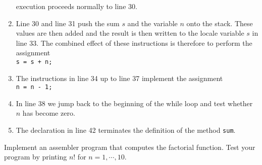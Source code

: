 \begin{enumerate}
      execution proceeds normally to line 30.
\item Line 30 and line 31 push the sum $s$ and the variable $n$ onto the stack.  These
      values are then added and the result is then written to the locale variable $s$ in line 33.
      The combined effect of these instructions is therefore to perform the assignment
      \\[0.2cm]
      \hspace*{1.3cm}
      \texttt{s = s + n;}
\item The instructions in line 34 up to line 37 implement the assignment 
      \\[0.2cm]
      \hspace*{1.3cm}
      \texttt{n = n - 1;}
\item In line 38 we jump back to the beginning of the while loop and test whether $n$ has become
      zero.  
\item The declaration in line 42 terminates the definition of the method \texttt{sum}.
\end{enumerate}

\exercise
Implement an assembler program that computes the factorial function.  Test your program by printing
$n!$ for $n = 1, \cdots, 10$.

